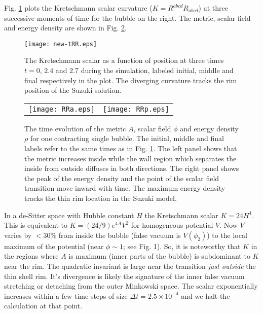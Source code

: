 \documentclass[preprintnumbers,eqsecnum,aps,prd,epsf,showpacs,nofootinbib
]{revtex4}
\begin{document}
Fig. \ref{fig-RRx} plots the Kretschmann scalar curvature
($K=R^{abcd}R_{abcd}$) at three successive moments of time for the
bubble on the right. The metric, scalar field and energy density are
shown in Fig. \ref{fig-RRap}.
\begin{figure}[htbp]
\begin{center}
\texttt{[image: new-tRR.eps]}
\end{center}
\caption{The Kretschmann scalar as a function of position at three
  times $t=0$, $2.4$ and $2.7$ during the simulation, labeled initial,
  middle and final respectively in the plot. The diverging curvature tracks
  the rim position of the Suzuki solution.}
\label{fig-RRx}
\end{figure}
\begin{figure}[htbp]
\begin{center}
\begin{tabular}{ll}
\texttt{[image: RRa.eps]} &
\hspace{0.5cm}
\texttt{[image: RRp.eps]} 
\end{tabular}
\end{center}
\caption{The time evolution of the metric $A$, scalar field $\phi$ and
  energy density $\rho$ for one contracting single bubble. The
  initial, middle and final labels refer to the same times as in
  Fig. \ref{fig-RRx}. The left panel shows that the metric increases
  inside while the wall region which separates the inside from outside
  diffuses in both directions. The right panel shows the peak of the
  energy density and the point of the scalar field transition move
  inward with time. The maximum energy density tracks the thin
  rim location in the Suzuki model.}
\label{fig-RRap}
\end{figure}
In a de-Sitter space with Hubble constant $H$ the Kretschmann scalar
$K=24 H^4$.  This is equivalent to $K = (24/9)e^{4A}V^2$ for
homogeneous potential $V$. Now $V$ varies by $< 30$\% from inside the
bubble (false vacuum is $V(\phi_2)$) to the local maximum of the
potential (near $\phi \sim 1$; see Fig. 1). So, it is noteworthy that
$K$ in the regions where $A$ is maximum (inner parts of the bubble) is
subdominant to $K$ near the rim. The quadratic invariant is large near
the transition {\it just outside} the thin shell rim. It's divergence
is likely the signature of the inner false vacuum stretching or
detaching from the outer Minkowski space. The scalar exponentially
increases within a few time steps of size $\Delta t = 2.5 \times
10^{-4}$ and we halt the calculation at that point.
\end{document}
